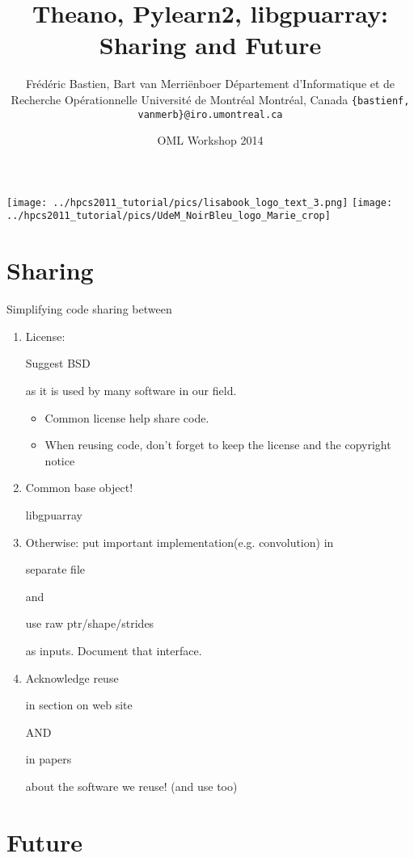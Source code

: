 \documentclass[utf8x,xcolor=pdftex,dvipsnames,table]{beamer}
\title{Theano, Pylearn2, libgpuarray: Sharing and Future}
\author{%
\footnotesize
Frédéric Bastien, Bart van Merriënboer \newline
Département d'Informatique et de Recherche Opérationnelle \newline
Université de Montréal \newline
Montréal, Canada \newline
\texttt{\{bastienf, vanmerb\}@iro.umontreal.ca} \newline \newline
}
\date{OML Workshop 2014}
\begin{document}
\begin{frame}[plain]
 \titlepage
 \vspace{-5em}
 \texttt{[image: ../hpcs2011\_tutorial/pics/lisabook\_logo\_text\_3.png]}
 \hfill
 \texttt{[image: ../hpcs2011\_tutorial/pics/UdeM\_NoirBleu\_logo\_Marie\_crop]}
\end{frame}

\section{Sharing}
\begin{frame}{Simplifying code sharing between}\setcounter{page}{1}
\begin{enumerate}
  \item<1-> License: \begin{bf}Suggest BSD\end{bf} as it is used by many software in our field.
    \begin{itemize}
    \item Common license help share code.
    \item When reusing code, don't forget to keep the license and the copyright notice
    \end{itemize}
  \item<2-> Common base object! \begin{bf}libgpuarray\end{bf}
  \item<3-> Otherwise: put important implementation(e.g. convolution) in \begin{bf}separate file\end{bf} and \begin{bf}use raw ptr/shape/strides\end{bf} as inputs. Document that interface.
  \item<4-> Acknowledge reuse \begin{bf}in section on web site\end{bf} AND \begin{bf}in papers\end{bf} about the software we reuse! (and use too)
\end{enumerate}
\end{frame}


\section{Future}
\begin{frame}
  \tableofcontents[currentsection]
\end{frame}
\end{document}
